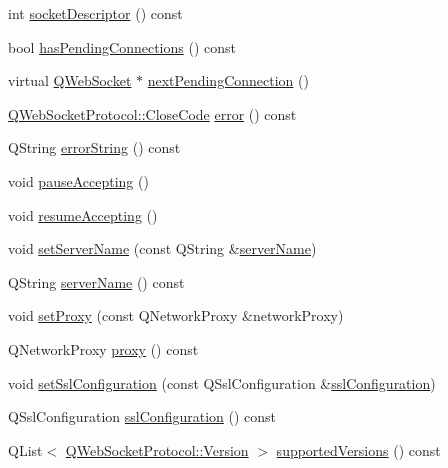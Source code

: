 \begin{DoxyCompactItemize}
\item 
int \mbox{\hyperlink{class_q_web_socket_server_a3b83cfc7602ecd27ca21a1ec80220dc0}{socket\+Descriptor}} () const
\item 
bool \mbox{\hyperlink{class_q_web_socket_server_a90cd25d1e2fb4fdcc3cc7fdb4858db41}{has\+Pending\+Connections}} () const
\item 
virtual \mbox{\hyperlink{class_q_web_socket}{Q\+Web\+Socket}} $\ast$ \mbox{\hyperlink{class_q_web_socket_server_ad2463f7d2f2576268d193186ee516c94}{next\+Pending\+Connection}} ()
\item 
\mbox{\hyperlink{namespace_q_web_socket_protocol_a9f236676f594451d8d723f260b71028c}{Q\+Web\+Socket\+Protocol\+::\+Close\+Code}} \mbox{\hyperlink{class_q_web_socket_server_ad7db68dd641e6a5ff0c40b8b4788e1fc}{error}} () const
\item 
Q\+String \mbox{\hyperlink{class_q_web_socket_server_a7c86fee3522b6ba2aad22418fbace5bd}{error\+String}} () const
\item 
void \mbox{\hyperlink{class_q_web_socket_server_abebb5c4066427590c3d4aacecfe51567}{pause\+Accepting}} ()
\item 
void \mbox{\hyperlink{class_q_web_socket_server_abd60e2bf5ca8e58e15ff3ac061af85ba}{resume\+Accepting}} ()
\item 
void \mbox{\hyperlink{class_q_web_socket_server_af8425750d42f210de95cfbb6ad4c287a}{set\+Server\+Name}} (const Q\+String \&\mbox{\hyperlink{class_q_web_socket_server_afe6a71eb2545bc81df2d847c66259d1f}{server\+Name}})
\item 
Q\+String \mbox{\hyperlink{class_q_web_socket_server_afe6a71eb2545bc81df2d847c66259d1f}{server\+Name}} () const
\item 
void \mbox{\hyperlink{class_q_web_socket_server_a56705b340b945790676ddebe8225c65e}{set\+Proxy}} (const Q\+Network\+Proxy \&network\+Proxy)
\item 
Q\+Network\+Proxy \mbox{\hyperlink{class_q_web_socket_server_ae7b37544dd4e6490d777ed4f5e0699ad}{proxy}} () const
\item 
void \mbox{\hyperlink{class_q_web_socket_server_a543df52afcb224e3bd8c32b02f757de9}{set\+Ssl\+Configuration}} (const Q\+Ssl\+Configuration \&\mbox{\hyperlink{class_q_web_socket_server_ae1f454fd2ce66388241f8b7acb680ad5}{ssl\+Configuration}})
\item 
Q\+Ssl\+Configuration \mbox{\hyperlink{class_q_web_socket_server_ae1f454fd2ce66388241f8b7acb680ad5}{ssl\+Configuration}} () const
\item 
Q\+List$<$ \mbox{\hyperlink{namespace_q_web_socket_protocol_ad53f2684577effe0a517eadb48714df3}{Q\+Web\+Socket\+Protocol\+::\+Version}} $>$ \mbox{\hyperlink{class_q_web_socket_server_a3f745ed90c56fca215144f6a6511786e}{supported\+Versions}} () const
\end{DoxyCompactItemize}


